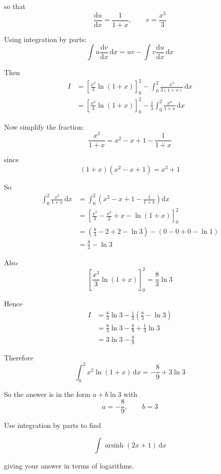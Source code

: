 \documentclass[leqno]{article}
\begin{document}
\begin{enumerate}[
  label=\textbf{\arabic*.},
  leftmargin=*,
  topsep=0pt,
  partopsep=0pt,
  parsep=0pt
]
\begin{djsSolution}
so that
\[
\frac{\mathrm{d}u}{\mathrm{d}x}=\frac{1}{1+x}, \qquad v=\frac{x^3}{3}
\]

Using integration by parts:
\[
\int u\frac{\mathrm{d}v}{\mathrm{d}x}\,\mathrm{d}x = uv - \int v\frac{\mathrm{d}u}{\mathrm{d}x}\,\mathrm{d}x
\]

Then
\begin{align*}
I&=\left[\frac{x^3}{3}\ln(1+x)\right]_0^2-\int_0^2 \frac{x^3}{3(1+x)}\,\mathrm{d}x \\
&=\left[\frac{x^3}{3}\ln(1+x)\right]_0^2-\frac13\int_0^2 \frac{x^3}{1+x}\,\mathrm{d}x
\end{align*}

Now simplify the fraction:
\[
\frac{x^3}{1+x}=x^2-x+1-\frac{1}{1+x}
\]

since
\[
(1+x)(x^2-x+1)=x^3+1
\]

So
\begin{align*}
\int_0^2 \frac{x^3}{1+x}\,\mathrm{d}x
&=\int_0^2 \left(x^2-x+1-\frac{1}{1+x}\right)\mathrm{d}x \\
&=\left[\frac{x^3}{3}-\frac{x^2}{2}+x-\ln(1+x)\right]_0^2 \\
&=\left(\frac{8}{3}-2+2-\ln 3\right)-\left(0-0+0-\ln 1\right) \\
&=\frac{8}{3}-\ln 3
\end{align*}

Also
\[
\left[\frac{x^3}{3}\ln(1+x)\right]_0^2=\frac{8}{3}\ln 3
\]

Hence
\begin{align*}
I&=\frac{8}{3}\ln 3-\frac13\left(\frac{8}{3}-\ln 3\right) \\
&=\frac{8}{3}\ln 3-\frac{8}{9}+\frac13\ln 3 \\
&=3\ln 3-\frac{8}{9}
\end{align*}

Therefore
\[
\int_0^2 x^2\ln(1+x)\,\mathrm{d}x=-\frac89+3\ln 3
\]

So the answer is in the form \(a+b\ln 3\) with
\[
a=-\frac89, \qquad b=3
\]
\end{djsSolution}


\newpage

\questionitem

Use integration by parts to find 

\[
\int \operatorname{arsinh}(2x+1)\, \mathrm{d}x
\]

giving your answer in terms of logarithms. 

\vspace*{10pt}


\end{enumerate}
\end{document}
